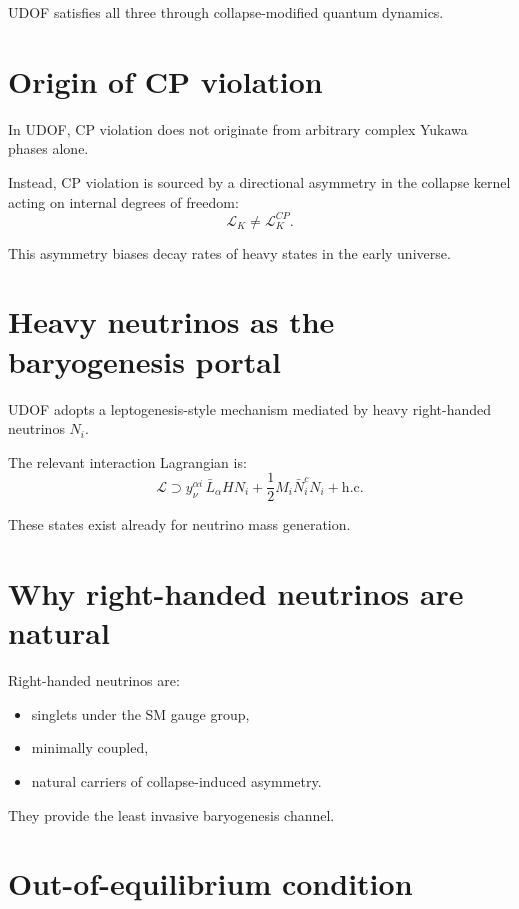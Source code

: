 \documentclass[11pt]{book}
\begin{document}
UDOF satisfies all three through collapse-modified quantum dynamics.

\section{Origin of CP violation}

In UDOF, CP violation does not originate from arbitrary complex Yukawa
phases alone.

Instead, CP violation is sourced by a directional asymmetry in the
collapse kernel acting on internal degrees of freedom:
\begin{equation}
\mathcal{L}_K \neq \mathcal{L}_K^{CP}.
\end{equation}

This asymmetry biases decay rates of heavy states in the early universe.

\section{Heavy neutrinos as the baryogenesis portal}

UDOF adopts a leptogenesis-style mechanism mediated by heavy
right-handed neutrinos $N_i$.

The relevant interaction Lagrangian is:
\begin{equation}
\mathcal{L} \supset
y_{\nu}^{\alpha i}\,\bar{L}_\alpha H N_i
+
\frac{1}{2} M_i \bar{N}_i^c N_i
+ \text{h.c.}
\end{equation}

These states exist already for neutrino mass generation.

\section{Why right-handed neutrinos are natural}

Right-handed neutrinos are:
\begin{itemize}
\item singlets under the SM gauge group,
\item minimally coupled,
\item natural carriers of collapse-induced asymmetry.
\end{itemize}

They provide the least invasive baryogenesis channel.

\section{Out-of-equilibrium condition}
\end{document}
